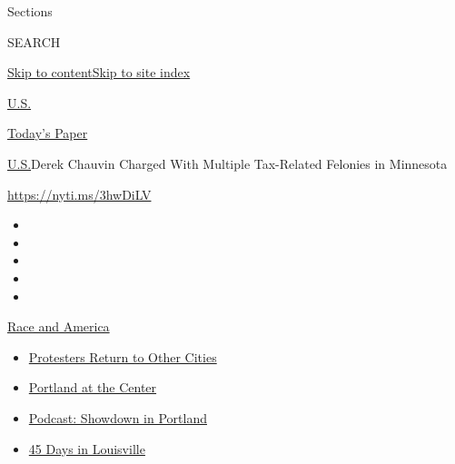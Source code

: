 Sections

SEARCH

\protect\hyperlink{site-content}{Skip to
content}\protect\hyperlink{site-index}{Skip to site index}

\href{https://www.nytimes3xbfgragh.onion/section/us}{U.S.}

\href{https://myaccount.nytimes3xbfgragh.onion/auth/login?response_type=cookie\&client_id=vi}{}

\href{https://www.nytimes3xbfgragh.onion/section/todayspaper}{Today's
Paper}

\href{/section/us}{U.S.}\textbar{}Derek Chauvin Charged With Multiple
Tax-Related Felonies in Minnesota

\url{https://nyti.ms/3hwDiLV}

\begin{itemize}
\item
\item
\item
\item
\item
\end{itemize}

\href{https://www.nytimes3xbfgragh.onion/news-event/george-floyd-protests-minneapolis-new-york-los-angeles?action=click\&pgtype=Article\&state=default\&region=TOP_BANNER\&context=storylines_menu}{Race
and America}

\begin{itemize}
\tightlist
\item
  \href{https://www.nytimes3xbfgragh.onion/2020/07/26/us/protests-portland-seattle-trump.html?action=click\&pgtype=Article\&state=default\&region=TOP_BANNER\&context=storylines_menu}{Protesters
  Return to Other Cities}
\item
  \href{https://www.nytimes3xbfgragh.onion/2020/07/24/us/portland-oregon-protests-white-race.html?action=click\&pgtype=Article\&state=default\&region=TOP_BANNER\&context=storylines_menu}{Portland
  at the Center}
\item
  \href{https://www.nytimes3xbfgragh.onion/2020/07/23/podcasts/the-daily/portland-protests.html?action=click\&pgtype=Article\&state=default\&region=TOP_BANNER\&context=storylines_menu}{Podcast:
  Showdown in Portland}
\item
  \href{https://www.nytimes3xbfgragh.onion/interactive/2020/07/16/us/black-lives-matter-protests-louisville-breonna-taylor.html?action=click\&pgtype=Article\&state=default\&region=TOP_BANNER\&context=storylines_menu}{45
  Days in Louisville}
\end{itemize}

